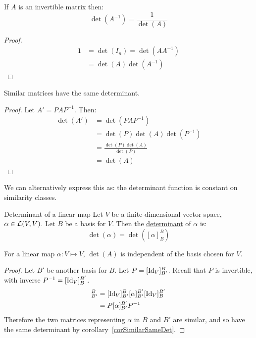 \documentclass[../Main.tex]{subfiles}
\begin{document}
\begin{corollary}
    If $A$ is an invertible matrix then:
    \begin{equation*}
        \det(A^{-1}) = \frac{1}{\det(A)}
    \end{equation*}
    \label{corInvertDet}
\end{corollary}
\begin{proof}
    \begin{align*}
        1 &= \det(I_n) = \det(AA^{-1}) \\
        &= \det(A) \det(A^{-1})
    \end{align*}
\end{proof}
\begin{corollary}
    Similar matrices have the same determinant.
    \label{corSimilarSameDet}
\end{corollary}
\begin{proof}
    Let $A' = PAP^{-1}$. Then:
    \begin{align*}
        \det(A') &= \det(PAP^{-1}) \\
        &= \det(P) \det(A) \det(P^{-1}) \\
        &=\frac{\det(P) \det(A)}{\det(P)} \\
        &= \det(A)
    \end{align*}
\end{proof}
\begin{remark}
    We can alternatively express this as: the determinant function is constant on similarity classes.
\end{remark}
\begin{definition}{Determinant of a linear map}
    Let $V$ be a finite-dimensional vector space, $\alpha \in \mathcal{L}(V, V)$. Let $B$ be a basis for $V$. Then the \underline{determinant} of $\alpha$ is:
    \begin{equation*}
        \det(\alpha) = \det([\alpha]_B^B)
    \end{equation*}
\end{definition}
\begin{proposition}
    For a linear map $\alpha : V\mapsto V$, $\det(A)$ is independent of the basis chosen for $V$.
    \label{propDetLinMapUnique}
\end{proposition}
\begin{proof}
    Let $B'$ be another basis for $B$. Let $P = [\operatorname{Id}_V]^B_{B'}$. Recall that $P$ is invertible, with inverse $P^{-1} = [\operatorname{Id}_V]_B^{B'}$.
    \begin{align*}
        [\alpha]_{B'}^B &= [\Id_V]_{B'}^B [\alpha]_{B'}^{B'} [\Id_V]_{B}^{B'}\\ 
        &= P[\alpha]_{B'}^{B'} P^{-1}
    \end{align*}
    Therefore the two matrices representing $\alpha$ in $B$ and $B'$ are similar, and so have the same determinant by corollary~\ref{corSimilarSameDet}.
\end{proof}
\end{document}
